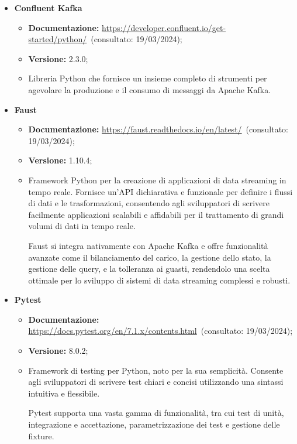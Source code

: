 \begin{itemize}
    \item \textbf{Confluent Kafka}
    \begin{itemize}
        \item \textbf{Documentazione:} \url{https://developer.confluent.io/get-started/python/}~(consultato: 19/03/2024);
        \item \textbf{Versione:} 2.3.0;
        \item Libreria Python che fornisce un insieme completo di strumenti per agevolare la produzione e il consumo di messaggi da Apache Kafka.
    \end{itemize}
    
    \item \textbf{Faust}
    \begin{itemize}
        \item \textbf{Documentazione:} \url{https://faust.readthedocs.io/en/latest/}~(consultato: 19/03/2024);
        \item \textbf{Versione:} 1.10.4;
        \item Framework Python per la creazione di applicazioni di data streaming in tempo reale. Fornisce un'API dichiarativa e funzionale per definire i flussi di dati e le trasformazioni, consentendo agli sviluppatori di scrivere facilmente applicazioni scalabili e affidabili per il trattamento di grandi volumi di dati in tempo reale.
        
        Faust si integra nativamente con Apache Kafka e offre funzionalità avanzate come il bilanciamento del carico, la gestione dello stato, la gestione delle query, e la tolleranza ai guasti, rendendolo una scelta ottimale per lo sviluppo di sistemi di data streaming complessi e robusti.
    \end{itemize}
    
    \item \textbf{Pytest}
    \begin{itemize}
        \item \textbf{Documentazione:} \url{https://docs.pytest.org/en/7.1.x/contents.html}~(consultato: 19/03/2024);
        \item \textbf{Versione:} 8.0.2;
        \item Framework di testing per Python, noto per la sua semplicità. Consente agli sviluppatori di scrivere test chiari e concisi utilizzando una sintassi intuitiva e flessibile.
        
        Pytest supporta una vasta gamma di funzionalità, tra cui test di unità, integrazione e accettazione, parametrizzazione dei test e gestione delle fixture.


\end{itemize}
\end{itemize}
